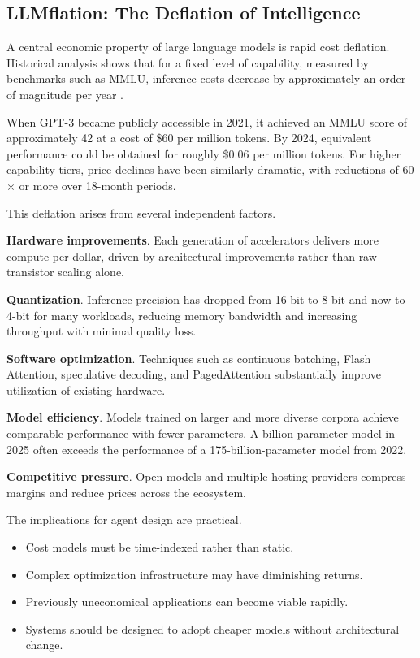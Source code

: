 \subsection{LLMflation: The Deflation of Intelligence}

A central economic property of large language models is rapid cost deflation. Historical analysis shows that for a fixed level of capability, measured by benchmarks such as MMLU, inference costs decrease by approximately an order of magnitude per year \cite{llmflation2024, epochpricing2025}.

When GPT-3 became publicly accessible in 2021, it achieved an MMLU score of approximately 42 at a cost of \$60 per million tokens. By 2024, equivalent performance could be obtained for roughly \$0.06 per million tokens. For higher capability tiers, price declines have been similarly dramatic, with reductions of 60$\times$ or more over 18-month periods.

This deflation arises from several independent factors.

\textbf{Hardware improvements}. Each generation of accelerators delivers more compute per dollar, driven by architectural improvements rather than raw transistor scaling alone.

\textbf{Quantization}. Inference precision has dropped from 16-bit to 8-bit and now to 4-bit for many workloads, reducing memory bandwidth and increasing throughput with minimal quality loss.

\textbf{Software optimization}. Techniques such as continuous batching, Flash Attention, speculative decoding, and PagedAttention substantially improve utilization of existing hardware.

\textbf{Model efficiency}. Models trained on larger and more diverse corpora achieve comparable performance with fewer parameters. A billion-parameter model in 2025 often exceeds the performance of a 175-billion-parameter model from 2022.

\textbf{Competitive pressure}. Open models and multiple hosting providers compress margins and reduce prices across the ecosystem.

The implications for agent design are practical.
\begin{itemize}
\item Cost models must be time-indexed rather than static.
\item Complex optimization infrastructure may have diminishing returns.
\item Previously uneconomical applications can become viable rapidly.
\item Systems should be designed to adopt cheaper models without architectural change.
\end{itemize}

